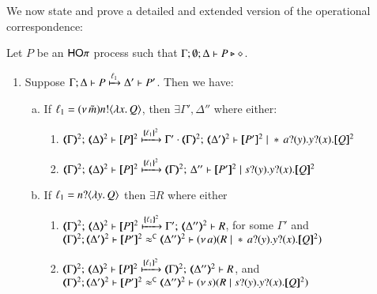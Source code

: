 We now state and prove a detailed and extended
version of the operational correspondence:

\begin{proposition}\myrm
	\label{app:prop:op_corr_HOp_to_p}
	Let $P$ be an  $\mathsf{HO}\pi$ process such that  $\Gamma; \emptyset; \Delta \vdash P \triangleright \diamond$.
	
	\begin{enumerate}[1.]
		\item Suppose $\Gamma; \Delta \vdash P \xmapsto{\ell_1} \Delta' \vdash P'$.
		Then we have:
		\begin{enumerate}[a)]
			\item
				If  $\ell_1 = (\nu\, \tilde{m})n ! \langle \lambda x.\,Q \rangle$,
				then $\exists \Gamma', \Delta''$ where either:
				\begin{enumerate}[-]
					\item 
						$\tmap{\Gamma}{2};\, \tmap{\Delta}{2} \proves  \pmap{P}{2} 
						\hby{\mapa{\ell_1}^{2}}
						\Gamma' \cdot \tmap{\Gamma}{2};\, \tmap{\Delta'}{2} \proves \pmap{P'}{2} \Par \repl{} \binp{a}{y} \binp{y}{x} \pmap{Q}{2}$
					\item 
						$\tmap{\Gamma}{2};\, \tmap{\Delta}{2} \proves \pmap{P}{2} 
						\hby{\mapa{\ell_1}^{2}}
						\tmap{\Gamma}{2};\, \Delta'' \proves \pmap{P'}{2} \Par \binp{s}{y} \binp{y}{x} \pmap{Q}{2}$
				\end{enumerate}

			\item
				If   
				$\ell_1 = n ? \langle \lambda y.\,Q \rangle$
				then $\exists R$ where
				either
				\begin{enumerate}[-]
					\item 
						$\tmap{\Gamma}{2};\, \tmap{\Delta}{2} \proves \pmap{P}{2} 
						\hby{\mapa{\ell_1}^{2}}
						\Gamma';\, \tmap{\Delta''}{2} \proves  R$, for some $ \Gamma'$
						and \\ 
						$\horel{\tmap{\Gamma}{2}}{\tmap{\Delta'}{2}}{\pmap{P'}{2}}{\fwb}{\tmap{\Delta''}{2}}{\newsp{a}{R \Par \repl{} \binp{a}{y} \binp{y}{x} \pmap{Q}{2}}}$
					\item 
						$\tmap{\Gamma}{2};\, \tmap{\Delta}{2} \proves \pmap{P}{2}
						\hby{\mapa{\ell_1}^{2}}
						\tmap{\Gamma}{2};\, \tmap{\Delta''}{2} \proves R$, 
						and \\ 
						$\horel{\tmap{\Gamma}{2}}{\tmap{\Delta'}{2}}{\pmap{P'}{2}}{\fwb}{\tmap{\Delta''}{2}}{\newsp{s}{R \Par \binp{s}{y} \binp{y}{x} \pmap{Q}{2}}}$  		
				\end{enumerate}


\end{enumerate}
\end{enumerate}
\end{proposition}

